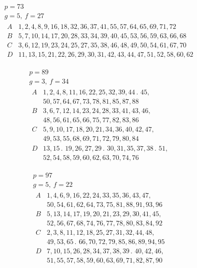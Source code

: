 \[
\begin{gathered}
p=73\\
g=5,\ f=27\\[3pt]
\begin{array}{c|l}
A&1,2,4,8,9,16,18,32,36,37,41,55,57,64,65,69,71,72\\
B&5,7,10,14,17,20,28,33,34,39,40,45,53,56,59,63,66,68\\
C&3,6,12,19,23,24,25,27,35,38,46,48,49,50,54,61,67,70\\
D&11,13,15,21,22,26,29,30,31,42,43,44,47,51,52,58,60,62
\end{array}
\end{gathered}
\]

%
\[
\begin{gathered}
p=89\\
g=3,\ f=34\\[3pt]
\begin{array}{c|l}
A&1,2,4,8,11,16,22,25,32,39,44\mathpunct{.}\,45,\\
&50,57,64,67,73,78,81,85,87,88\\
B&3,6,7,12,14,23,24,28,33,41,43,46,\\
&48,56,61,65,66,75,77,82,83,86\\
C&5,9,10,17,18,20,21,34,36,40,42,47,\\
&49,53,55,68,69,71,72,79,80,84\\
D&13,15\mathpunct{.}\,19,26,27,29\mathpunct{.}\,30,31,35,37,38\mathpunct{.}\,51,\\
&52,54,58,59,60,62,63,70,74,76
\end{array}
\end{gathered}
\]

\[
\begin{gathered}
p=97\\
g=5,\ f=22\\[3pt]
\begin{array}{c|l}
A&1,4,6,9,16,22,24,33,35,36,43,47,\\
&50,54,61,62,64,73,75,81,88,91,93,96\\
B&5,13,14,17,19,20,21,23,29,30,41,45,\\
&52,56,67,68,74,76,77,78,80,83,84,92\\
C&2,3,8,11,12,18,25,27,31,32,44,48,\\
&49,53,65\mathpunct{.}\,66,70,72,79,85,86,89,94,95\\
D&7,10,15,26,28,34,37,38,39\mathpunct{.}\,40,42,46,\\
&51,55,57,58,59,60,63,69,71,82,87,90
\end{array}
\end{gathered}
\]


